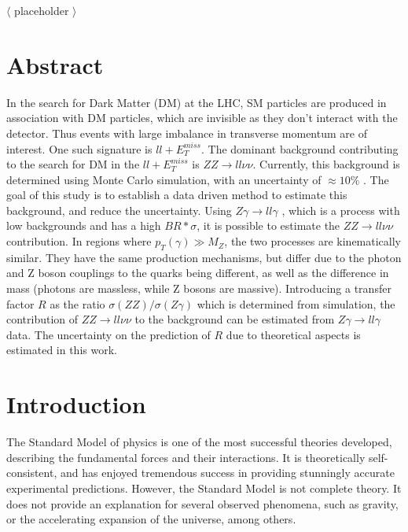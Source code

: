 \documentclass[11pt,a4paper]{report}
\newcommand{\ZZ}{$ZZ\to ll\nu\nu$ }
\newcommand{\Zg}{$Z\gamma\to ll\gamma$ }
\newcommand\blankpage{%
    \null
    \thispagestyle{empty}%
    \addtocounter{page}{-1}%
    \newpage}
\begin{document}
$\langle$ placeholder $\rangle$

\newpage
\blankpage
\newpage

\chapter*{Abstract}
\setcounter{page}{1}
In the search for Dark Matter (DM) at the LHC, SM particles are produced in association with DM particles, which are invisible as they don't interact with the detector. Thus events with large imbalance in transverse momentum are of interest. One such signature is $ll + E_T^{miss}$. The dominant background contributing to the search for DM in the $ll + E_T^{miss}$ is $ZZ \rightarrow ll\nu\nu$.  Currently, this background is determined using Monte Carlo simulation, with an uncertainty of $\approx 10\%$ \cite{ZH_ATLAS}. The goal of this study is to establish a data driven method to estimate this background, and reduce the uncertainty. Using \Zg, which is a process with low backgrounds and has a high $BR*\sigma$, it is possible to estimate the \ZZ contribution. In regions where $p_{T}(\gamma) \gg M_{Z}$, the two processes are kinematically similar. They have the same production mechanisms, but differ due to the photon and Z boson couplings to the quarks being different, as well as the difference in mass (photons are massless, while Z bosons are massive). Introducing a transfer factor $R$ as the ratio $\sigma(ZZ)/\sigma(Z\gamma)$ which is determined from simulation, the contribution of \ZZ to the background can be estimated from \Zg data. The uncertainty on the prediction of $R$ due to theoretical aspects is estimated in this work.

\cleardoublepage
\pagestyle{plain}
\tableofcontents
\thispagestyle{empty}
\newpage
\cleardoublepage
{}
\chapter{Introduction}
\setcounter{page}{1}

The Standard Model of physics is one of the most successful theories developed, describing the fundamental forces and their interactions. It is theoretically self-consistent, and has enjoyed tremendous success in providing stunningly accurate experimental predictions. However, the Standard Model is not complete theory. It does not provide an explanation for several observed phenomena, such as gravity, or the accelerating expansion of the universe, among others.
\end{document}
